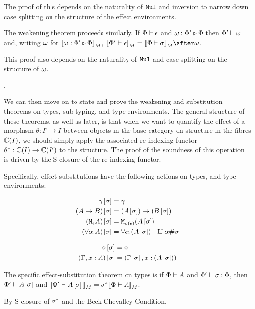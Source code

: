\documentclass{Report}
\begin{document}
\proof

The proof of this depends on the naturality of $\texttt{Mul}$ and inversion to narrow down case splitting on the structure of the effect environments.

The weakening theorem proceeds similarly. If $\Phi\vdash \epsilon$ and $\omega : \Phi' \triangleright \Phi$ then $\Phi'\vdash \omega$ and, writing $\omega$ for ${\bf [\![}\omega : \Phi' \triangleright \Phi{\bf ]\!]}_M$,  $\deno{\wellformed{\P'}{\e}} = \deno{\wellformed{\P}{\si}}\after\w$.

\proof
This proof also depends on the naturality of $\texttt{Mul}$ and case splitting on the structure of $\omega$.

.


We can then move on to state and prove the weakening and substitution theorems on types, sub-typing, and type environments. The general structure of these theorems, as well as later, is that when we want to quantify the effect of a morphism $\theta: I' \rightarrow I$ between objects in the base category on structure in the fibres $\mathbb{C}(I)$, we should simply apply the associated re-indexing functor $\theta^*: \mathbb{C}(I) \rightarrow \mathbb{C}(I')$ to the structure. The proof of the soundness of this operation is driven by the S-closure of the re-indexing functor.

Specifically, effect substitutions have the following actions on types, and type-environments:

\begin{align*}
    \gamma\left[\sigma\right] &= \gamma \\
    (A\rightarrow B)\left[\sigma\right] &= (A\left[\sigma\right])\rightarrow (B\left[\sigma\right]) \\
    (\texttt{M}_{\epsilon}{A})\left[\sigma\right] &= \texttt{M}_{\sigma(\epsilon)}{(A\left[\sigma\right])}\\
    (\forall \alpha. A)\left[\sigma\right] &= \forall \alpha. (A\left[\sigma\right])\quad\text{If $\alpha\#\sigma$}
\end{align*}

\begin{align*}
    \diamond\left[\sigma\right] & = \diamond \\
    (\Gamma, x: A)\left[\sigma\right] &= (\Gamma\left[\sigma\right], x:(A\left[\sigma\right]))\\
\end{align*}

The specific effect-substitution theorem on types is if $\Phi\vdash A$ and $\Phi' \vdash \sigma \colon \Phi$, then $\Phi'\vdash A\left[\sigma\right]$ and ${\bf [\![}\Phi'\vdash A\left[\sigma\right]{\bf ]\!]}_M = \sigma^*{\bf [\![}\Phi\vdash A{\bf ]\!]}_M$.



\proof By S-closure of $\sigma^*$ and the Beck-Chevalley Condition.
\end{document}
